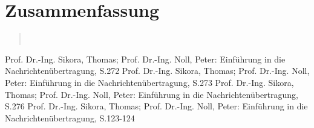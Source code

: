     
\section{Zusammenfassung}
\begin{quote}

     \\
\end{quote}%
         



\begin{thebibliography}{999}
  Prof. Dr.-Ing. Sikora, Thomas; Prof. Dr.-Ing. Noll, Peter: Einführung in die
 Nachrichtenübertragung, S.272
 Prof. Dr.-Ing. Sikora, Thomas; Prof. Dr.-Ing. Noll, Peter: Einführung in die
 Nachrichtenübertragung, S.273
 Prof. Dr.-Ing. Sikora, Thomas; Prof. Dr.-Ing. Noll, Peter: Einführung in die
 Nachrichtenübertragung, S.276
  Prof. Dr.-Ing. Sikora, Thomas; Prof. Dr.-Ing. Noll, Peter: Einführung in die
 Nachrichtenübertragung, S.123-124



\end{thebibliography}


  	    
